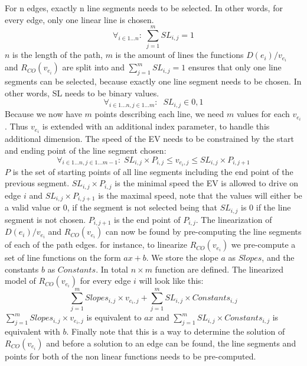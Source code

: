 For n edges, exactly n line segments needs to be selected. In other words, for every edge, only one linear line is chosen. 
\begin{equation*}
\forall_{i\in1 \dots n }:\; \sum_{j=1}^{m} SL_{i,j} = 1
\end{equation*}
$n$ is the length of the path, $m$ is the amount of lines the functions \( D(e_i)/v_{e_i} \) and $R_{CO}(v_{e_i})$ are split into and $\sum_{j=1}^{m} SL_{i,j} = 1$ ensures that only one line segments can be selected, because exactly one line segment needs to be chosen. In other words, SL needs to be binary values.
\begin{equation*}
\forall_{i\in1 \dots n, j \in 1 \dots m}: \; \; SL_{i,j} \in{0,1} 
\end{equation*}
Because we now have $m$ points describing each line, we need $m$ values for each $v_{e_i}$. Thus $v_{e_i}$ is extended with an additional index parameter, to handle this additional dimension. The speed of the EV needs to be constrained by the start and ending point of the line segment chosen:
\begin{equation*}
\forall_{i\in1 \dots n, j \in 1 \dots m-1}:\; SL_{i,j} \times P_{i,j}  \le  v_{e_i,j} \le SL_{i,j}\times P_{i,j+1}
\end{equation*}
$P$ is the set of starting points of all line segments including the end point of the previous segment. $SL_{i,j} \times P_{i,j}$ is the minimal speed the EV is allowed to drive on edge $i$ and $SL_{i,j}\times P_{i,j+1}$ is the maximal speed, note that the values will either be a valid value or $0$, if the segment is not selected being that $SL_{i,j}$ is $0$ if the line segment is not chosen. $P_{i,j+1}$ is the end point of $P_{i,j}$. 
The linearization of \( D(e_i)/v_{e_i} \) and $R_{CO}(v_{e_i})$ can now be found by pre-computing the line segments of each of the path edges. for instance, to linearize $R_{CO}(v_{e_i})$ we pre-compute a set of line functions on the form $ax+b$. We store the slope $a$ as $Slopes$, and the constants $b$ as $Constants$. In total $n \times m$ function are defined. The linearized model of $R_{CO}(v_{e_i})$ for every edge $i$ will look like this:
\begin{equation*}
\sum_{j=1}^{m} Slopes_{i,j}\times v_{e_i,j} + \sum_{j=1}^{m} SL_{i,j}\times Constants_{i,j} 
\end{equation*}
$\sum_{j=1}^{m} Slopes_{i,j}\times v_{e_i,j}$ is equivalent to $ax$ and $\sum_{j=1}^{m} SL_{i,j}\times Constants_{i,j}$ is equivalent with $b$. 
Finally note that this is a way to determine the solution of $R_{CO}(v_{e_i})$ and before a solution to an edge can be found, the line segments and points for both of the non linear functions needs to be pre-computed. 
